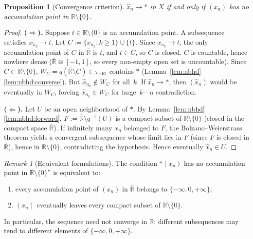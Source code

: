 \documentclass[11pt]{article}
\newtheorem{proposition}[theorem]{Proposition}
\theoremstyle{definition}
\theoremstyle{remark}
\newtheorem{remark}[theorem]{Remark}
\begin{document}
\begin{proposition}[Convergence criterion]\label{prop:seqconv}
$\hat{x}_n \to \ast$ in $X$ if and only if
$(x_n)$ has no accumulation point in $\mathbb{R}\setminus\{0\}$.
\end{proposition}
\begin{proof}
\textbf{($\Rightarrow$).}\;
Suppose $t \in \mathbb{R}\setminus\{0\}$ is an accumulation point.
A subsequence satisfies $x_{n_k} \to t$.
Let $C := \{x_{n_k} : k \ge 1\} \cup \{t\}$.
Since $x_{n_k} \to t$, the only accumulation point of $C$ in
$\overline{\mathbb{R}}$ is $t$, and $t \in C$, so $C$ is closed.
$C$ is countable, hence nowhere dense
($\overline{\mathbb{R}} \cong [-1,1]$, so every non-empty open set is
uncountable).
Since $C \subset \mathbb{R}\setminus\{0\}$,
$W_C = q(\overline{\mathbb{R}} \setminus C) \in \tau_{\mathrm{ERI}}$
contains $\ast$ (Lemma~\ref{lem:nbhd}\ref{lem:nbhd:converse}).
But $\hat{x}_{n_k} \notin W_C$ for all~$k$.
If $\hat{x}_n \to \ast$, then $(\hat{x}_n)$ would be eventually in
$W_C$, forcing $\hat{x}_{n_k} \in W_C$ for large~$k$---a
contradiction.

\medskip\noindent
\textbf{($\Leftarrow$).}\;
Let $U$ be an open neighborhood of $\ast$.
By Lemma~\ref{lem:nbhd}\ref{lem:nbhd:forward},
$F := \overline{\mathbb{R}} \setminus q^{-1}(U)$ is a compact subset of
$\mathbb{R}\setminus\{0\}$ (closed in the compact space $\overline{\mathbb{R}}$).
If infinitely many $x_n$ belonged to $F$, the
Bolzano--Weierstrass theorem yields a convergent subsequence whose limit
lies in $F$ (since $F$ is closed in $\overline{\mathbb{R}}$),
hence in $\mathbb{R}\setminus\{0\}$, contradicting the hypothesis.
Hence eventually $\hat{x}_n \in U$.
\end{proof}

\begin{remark}[Equivalent formulations]\label{rem:seqequiv}
The condition ``$(x_n)$ has no accumulation point in
$\mathbb{R}\setminus\{0\}$'' is equivalent to:
\begin{enumerate}[label=(\alph*),nosep]
\item every accumulation point of $(x_n)$ in $\overline{\mathbb{R}}$
  belongs to $\{-\infty, 0, +\infty\}$;
\item $(x_n)$ eventually leaves every compact subset of
  $\mathbb{R}\setminus\{0\}$.
\end{enumerate}
In particular, the sequence need not converge in $\overline{\mathbb{R}}$:
different subsequences may tend to different elements of
$\{-\infty, 0, +\infty\}$.
\end{remark}
\end{document}
